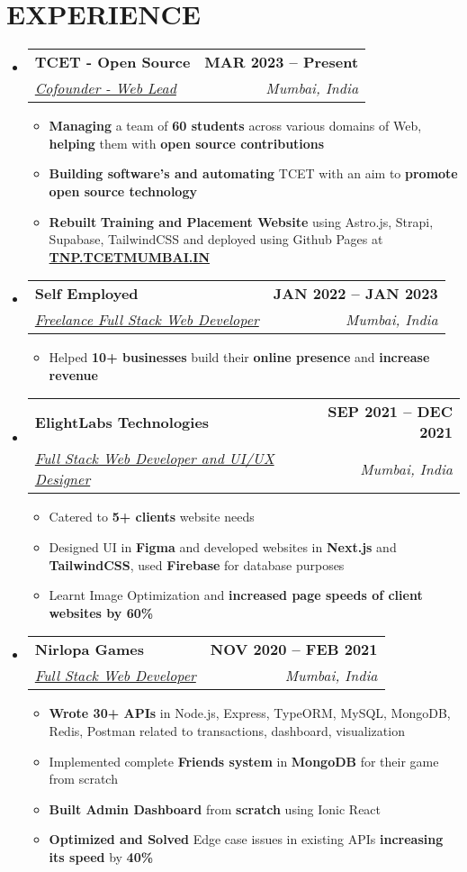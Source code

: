\documentclass{article}
\makeatletter
\newcommand{\resumeItem}[1]{
  \item\small{
    {#1 \vspace{-2pt}}
  }
}
\newcommand{\resumeSubheading}[4]{
  \vspace{-2pt}\item
    \begin{tabular*}{1.0\textwidth}[t]{l@{\extracolsep{\fill}}r}
      \textbf{\large#1} & \textbf{\small #2} \\
      \textit{\large#3} & \textit{\small #4} \\
      
    \end{tabular*}\vspace{-7pt}
}
\newcommand{\resumeSubHeadingListStart}{\begin{itemize}[leftmargin=0.0in, label={}]}
\newcommand{\resumeSubHeadingListEnd}{\end{itemize}}
\newcommand{\resumeItemListStart}{\begin{itemize}}
\newcommand{\resumeItemListEnd}{\end{itemize}\vspace{-5pt}}
\makeatother
\begin{document}
\section{EXPERIENCE}
  \resumeSubHeadingListStart

    \resumeSubheading
      {TCET - Open Source \href{https://opensource.tcetmumbai.in/}{\raisebox{-0.1\height}\faExternalLink }  \href{https://github.com/tcet-opensource/}{\raisebox{-0.1\height}\faGithub}}{MAR 2023 -- Present} 
      {\underline{Cofounder - Web Lead}}{Mumbai, India}
      \resumeItemListStart
        \resumeItem{\normalsize{\textbf{Managing} a team of \textbf{60 students} across various domains of Web, \textbf{helping} them with \textbf{open source contributions}}}\resumeItem{\normalsize{\textbf{Building software's and automating} TCET with an aim to \textbf{promote open source technology}  }}
        \resumeItem{\normalsize{\textbf{Rebuilt} \textbf{Training and Placement Website} using Astro.js, Strapi, Supabase, TailwindCSS and deployed using Github Pages at \href{https://tnp.tcetmumbai.in}{\textbf{TNP.TCETMUMBAI.IN}}  }}
  
      \resumeItemListEnd
    \resumeSubheading
      {Self Employed \href{certificate Link}{\raisebox{-0.1\height}}}{JAN 2022 -- JAN 2023} 
      {\underline{Freelance Full Stack Web Developer}}{Mumbai, India}
      \resumeItemListStart
        \resumeItem{\normalsize{Helped \textbf{10+ businesses} build their \textbf{online presence} and \textbf{increase revenue} }}
  
      \resumeItemListEnd
    \resumeSubheading
      {ElightLabs Technologies \href{https://elightlabs.com/}{\raisebox{-0.1\height}\faExternalLink}}{SEP 2021 -- DEC 2021} 
      {\underline{Full Stack Web Developer and UI/UX Designer}}{Mumbai, India}
      \resumeItemListStart
        \resumeItem{\normalsize{Catered to \textbf{5+ clients} website needs }}
         \resumeItem{\normalsize{Designed UI in \textbf{Figma} and developed websites in \textbf{Next.js} and \textbf{TailwindCSS}, used \textbf{Firebase} for database purposes }}
         \resumeItem{\normalsize{Learnt Image Optimization and \textbf{increased page speeds of client websites by 60\%}}}
      \resumeItemListEnd
  \resumeSubheading
      {Nirlopa Games \href{https://nirlopagames.com/}{\raisebox{-0.1\height}\faExternalLink}}{NOV 2020 -- FEB 2021} 
      {\underline{Full Stack Web Developer}}{Mumbai, India}
      \resumeItemListStart
        \resumeItem{\normalsize{\textbf{Wrote 30+ APIs} in Node.js, Express, TypeORM, MySQL, MongoDB, Redis, Postman related to transactions, dashboard, visualization}}
         \resumeItem{\normalsize{Implemented complete \textbf{Friends system} in \textbf{MongoDB} for their game from scratch }}
         \resumeItem{\normalsize{\textbf{Built Admin Dashboard} from \textbf{scratch} using Ionic React}}
         \resumeItem{\normalsize{ \textbf{Optimized and Solved }Edge case issues in existing APIs \textbf{increasing its speed} by \textbf{40\%} }}
      \resumeItemListEnd
  \resumeSubHeadingListEnd
\vspace{-12pt}
\end{document}
